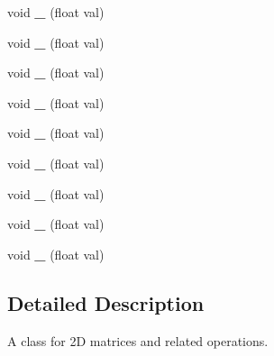 \begin{DoxyCompactItemize}
\item 
\hypertarget{classsteer_1_1_matrix2_d_acddbf8270511bb7dfd61a4753d2a9c16}{void {\bfseries \-\_} (float val)}\label{classsteer_1_1_matrix2_d_acddbf8270511bb7dfd61a4753d2a9c16}

\item 
\hypertarget{classsteer_1_1_matrix2_d_adb39c436c45fec58fa9fe5a7d7a627a1}{void {\bfseries \-\_} (float val)}\label{classsteer_1_1_matrix2_d_adb39c436c45fec58fa9fe5a7d7a627a1}

\item 
\hypertarget{classsteer_1_1_matrix2_d_ab21e9f647be058a4fe60688dcf0571e0}{void {\bfseries \-\_} (float val)}\label{classsteer_1_1_matrix2_d_ab21e9f647be058a4fe60688dcf0571e0}

\item 
\hypertarget{classsteer_1_1_matrix2_d_a4de7914e60183b632a207999a527c72e}{void {\bfseries \-\_} (float val)}\label{classsteer_1_1_matrix2_d_a4de7914e60183b632a207999a527c72e}

\item 
\hypertarget{classsteer_1_1_matrix2_d_ab795e404573c48931314eba5a2350e71}{void {\bfseries \-\_} (float val)}\label{classsteer_1_1_matrix2_d_ab795e404573c48931314eba5a2350e71}

\item 
\hypertarget{classsteer_1_1_matrix2_d_a4f87bb8844e3743387559856d83c61a1}{void {\bfseries \-\_} (float val)}\label{classsteer_1_1_matrix2_d_a4f87bb8844e3743387559856d83c61a1}

\item 
\hypertarget{classsteer_1_1_matrix2_d_a7b5a9ba0a45816ed8581df466efeff8c}{void {\bfseries \-\_} (float val)}\label{classsteer_1_1_matrix2_d_a7b5a9ba0a45816ed8581df466efeff8c}

\item 
\hypertarget{classsteer_1_1_matrix2_d_a9a7b86ff6d0fc0b3da1af968ac5da30f}{void {\bfseries \-\_} (float val)}\label{classsteer_1_1_matrix2_d_a9a7b86ff6d0fc0b3da1af968ac5da30f}

\item 
\hypertarget{classsteer_1_1_matrix2_d_a4ed0c8c1e153ebbd7507062edbab0fca}{void {\bfseries \-\_} (float val)}\label{classsteer_1_1_matrix2_d_a4ed0c8c1e153ebbd7507062edbab0fca}

\end{DoxyCompactItemize}


\subsection{Detailed Description}
A class for 2\-D matrices and related operations. 

